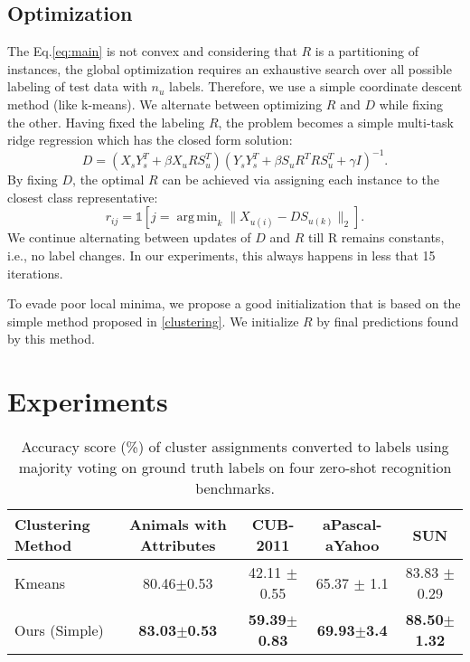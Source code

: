 \documentclass[10pt,twocolumn,letterpaper]{article}
\DeclareMathOperator*{\argmin}{arg\,min}
\begin{document}
\subsection{Optimization}
The Eq.\eqref{eq:main} is not convex and considering that $R$ is a partitioning of instances, the global optimization requires an
exhaustive search over all possible labeling of test data with $n_u$ labels. Therefore, we use a simple coordinate descent
method (like k-means). We alternate between optimizing $R$ and $D$ while fixing the other.
Having fixed the labeling $R$, the problem becomes a simple multi-task ridge regression which has the closed form solution:
\begin{equation} \label{eq:d_update}
  D = (X_s Y_s^T + \beta X_u R S_u^T) (Y_s Y_s^T + \beta S_u R^T R S_u^T  + \gamma I)^{-1}.
\end{equation}
By fixing $D$, the optimal $R$ can be achieved via assigning each instance to the closest class representative:
\begin{equation} \label{eq:r_update}
  r_{ij} = \mathds{1}[j = \argmin_{k} \lVert X_{u(i)} - D S_{u(k)} \rVert_2 ].
\end{equation}
We continue alternating between updates of $D$ and $R$ till R remains constants, i.e., no label changes. In our experiments, this always happens
in less that 15 iterations.

To evade poor local minima, we propose a good initialization that is based on the simple method proposed in \ref{clustering}. We initialize  $R$ by final predictions found by this method.
\section{Experiments} \label{experiments}
\begin{table*}[ht]
\begin{minipage}{\textwidth}
\centering
\caption{Accuracy score (\%) of cluster assignments converted to labels
using majority voting on ground truth labels on four zero-shot recognition benchmarks.} \vspace{2mm}
\begin{tabular}{|l|c|c|c|c|}
\hline
Clustering Method & Animals with Attributes & CUB-2011 & aPascal-aYahoo & SUN \\
\hline
Kmeans                             &  80.46$\pm$0.53 & 42.11 $\pm$0.55 &   65.37 $\pm$ 1.1      & 83.83 $\pm$ 0.29    \\

Ours (Simple)                     & \textbf{83.03$\pm$0.53}  & \textbf{59.39$\pm$0.83} & \textbf{69.93$\pm$3.4} & \textbf{ 88.50$\pm$1.32} \\
\hline
\end{tabular}
\vspace{2mm}
\end{minipage}
\end{table*}
\end{document}

